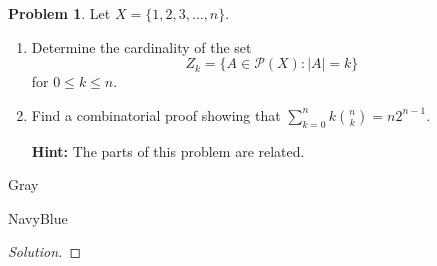 \documentclass[12pt]{amsart}
\newcounter{problem_number}[section]
\theoremstyle{named}
\newenvironment{soln}
{\begin{color}{Gray}\begin{framed}\begin{color}{NavyBlue}\begin{proof}[Solution]
\doublespacing}
{\end{proof}\end{color}\end{framed}\end{color}}
\theoremstyle{definition}
\newtheorem{problem}{Problem}
\begin{document}
\phantom{ }

\phantom{ }

\phantom{ }

\phantom{ }

\phantom{ }

\phantom{ }

\phantom{ }

\begin{problem}
	Let $X=\{1,2,3,\ldots,n\}$.
	\begin{enumerate}
		\item Determine the cardinality of the set 
		$$Z_k = \{A\in\mathscr{P}(X)\colon |A|=k\}$$
		for $0\leq k\leq n$.
	\item Find a combinatorial proof showing that $\displaystyle\sum_{k=0}^nk\binom{n}{k} = n2^{n-1}$.

	\textbf{Hint:} The parts of this problem are related.
	\end{enumerate}
\end{problem}

\begin{soln}

\end{soln}
\end{document}
